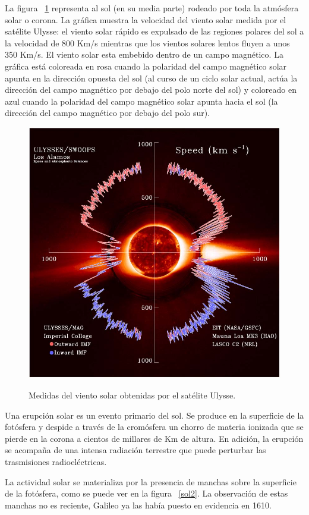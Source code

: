 \documentclass[a4paper,openright,12pt]{report}
\begin{document}
\pagebreak

La figura ~\ref{sol} representa al sol (en su media parte) rodeado por toda la atmósfera solar o corona. La gráfica muestra la velocidad del viento solar medida por el satélite Ulysse: el viento solar rápido es expulsado de las regiones polares del sol a la velocidad de 800 Km/s mientras que los vientos solares lentos fluyen a unos 350 Km/s. El viento solar esta embebido  dentro de un campo magnético. La gráfica está coloreada en rosa cuando la polaridad del campo magnético solar apunta en la dirección opuesta del sol (al curso de un ciclo solar actual, actúa la dirección del campo magnético por 	debajo del polo norte del sol) y coloreado en azul cuando la polaridad del campo magnético solar apunta hacia el sol (la dirección del campo magnético por debajo del polo sur).







\begin{figure}[H]
	\centering
\includegraphics[width=0.47 \textwidth]{img/sol.jpg}
	\caption{Medidas del viento solar obtenidas por el satélite Ulysse.} \cite{ESA}
	\label{sol}
\end{figure}


Una erupción solar es un evento primario del sol. Se produce en la superficie de la fotósfera y despide a través de la cromósfera un chorro de materia ionizada que se pierde en la corona a cientos de millares de Km de altura. En adición, la erupción se acompaña de una intensa radiación terrestre que puede perturbar las trasmisiones radioeléctricas.

La actividad solar se materializa por la presencia de manchas sobre la superficie de la fotósfera, como se puede ver en la figura ~\ref{sol2}. La observación de estas manchas no es reciente, Galileo ya las había puesto en evidencia en 1610.
\end{document}
